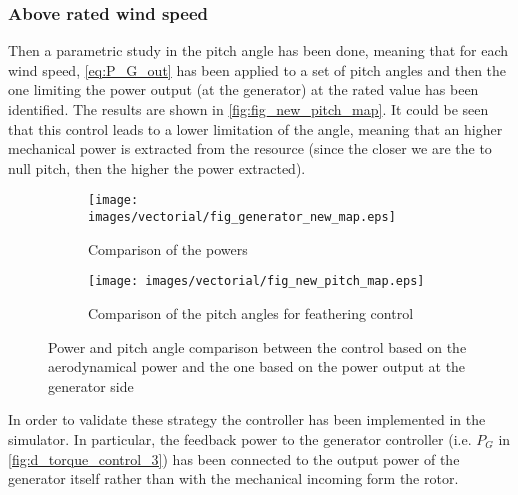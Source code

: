 \subsubsection{Above rated wind speed}
Then a parametric study in the pitch angle has been done, meaning that for each wind speed, \autoref{eq:P_G_out} has been applied to a set of pitch angles and then the one limiting the power output (at the generator) at the rated value has been identified. The results are shown in \autoref{fig:fig_new_pitch_map}. It could be seen that this control leads to a lower limitation of the angle, meaning that an higher mechanical power is extracted from the resource (since the closer we are the to null pitch, then the higher the power extracted).
\begin{figure}[htb]
  \begin{subfigure}{0.5\textwidth}
    \centering
    \texttt{[image: images/vectorial/fig\_generator\_new\_map.eps]}
    \caption{Comparison of the powers}
    \label{fig:fig_generator_new_map}
  \end{subfigure}
  \begin{subfigure}{0.5\textwidth}
    \centering
    \texttt{[image: images/vectorial/fig\_new\_pitch\_map.eps]}
    \caption{Comparison of the pitch angles for feathering control}
    \label{fig:fig_new_pitch_map}
\end{subfigure}
  \caption{Power and pitch angle comparison between the control based on the aerodynamical power and the one based on the power output at the generator side}
  \label{fig:fig_blade_control_gen_side}
\end{figure}
In order to validate these strategy the controller has been implemented in the simulator. In particular, the feedback power to the generator controller (i.e. $P_G$ in \autoref{fig:d_torque_control_3}) has been connected to the output power of the generator itself rather than with the mechanical incoming form the rotor.